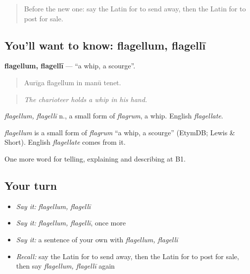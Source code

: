 \label{lesson:LA-C415-flagellum}



\begin{quote}
Before the new one: say the Latin for to send away, then the Latin for to post for sale.
\end{quote}

\subsection*{You'll want to know: flagellum, flagellī}
\textbf{flagellum, flagellī} — \textquotedblleft{}a whip, a scourge\textquotedblright{}.

\begin{quote}
Aurīga flagellum in manū tenet.
\end{quote}

\begin{quote}
\emph{The charioteer holds a whip in his hand.}
\end{quote}

\emph{flagellum, flagellī} n., a small form of \emph{flagrum}, a whip. English \emph{flagellate}.

\begin{cousinweb}
\emph{flagellum} is a small form of \emph{flagrum} \textquotedblleft{}a whip, a scourge\textquotedblright{} (EtymDB; Lewis \& Short). English \emph{flagellate} comes from it.
\end{cousinweb}

\begin{grammarlens}[title={What you've built}]
One more word for telling, explaining and describing at B1.
\end{grammarlens}

\subsection*{Your turn}
\begin{itemize}
\raggedright
  \item \emph{Say it:} \emph{flagellum, flagellī}
  \item \emph{Say it:} \emph{flagellum, flagellī}, once more
  \item \emph{Say it:} a sentence of your own with \emph{flagellum, flagellī}
  \item \emph{Recall:} say the Latin for to send away, then the Latin for to post for sale, then say \emph{flagellum, flagellī} again
\end{itemize}

